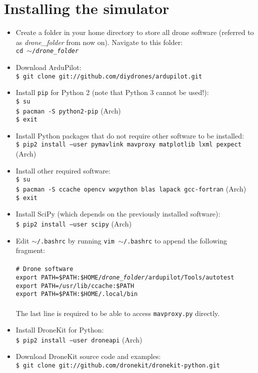 \documentclass{article}
\newcommand{\arch}{{\color{red} (Arch)}}
\begin{document}
\section*{Installing the simulator}
\begin{itemize}
    \item Create a folder in your home directory to store all drone software (referred to
          as \emph{drone\_folder} from now on). Navigate to this folder: \\
          {\tt cd $\sim$/\emph{drone\_folder}}
    \item Download ArduPilot: \\
          {\tt \$ git clone git://github.com/diydrones/ardupilot.git}
    \item Install {\tt pip} for Python 2 (note that Python 3 cannot be used!): \\
          {\tt \$ su} \\
          {\tt \$ pacman -S python2-pip} \arch{} \\
          {\tt \$ exit}
    \item Install Python packages that do not require other software to be installed: \\
          {\tt \$ pip2 install --user pymavlink mavproxy matplotlib lxml pexpect} \arch{}
    \item Install other required software: \\
          {\tt \$ su} \\
          {\tt \$ pacman -S ccache opencv wxpython blas lapack gcc-fortran} \arch{} \\
          {\tt \$ exit}
    \item Install SciPy (which depends on the previously installed software): \\
          {\tt \$ pip2 install --user scipy} \arch{}
    \item Edit {\tt $\sim$/.bashrc} by running {\tt vim $\sim$/.bashrc} to append the following fragment: \\\\
          {\tt \# Drone software} \\
          {\tt export PATH=\$PATH:\$HOME/\emph{drone\_folder}/ardupilot/Tools/autotest} \\
          {\tt export PATH=/usr/lib/ccache:\$PATH} \\
          {\tt export PATH=\$PATH:\$HOME/.local/bin} \\\\
          The last line is required to be able to access {\tt mavproxy.py} directly.
    \item Install DroneKit for Python: \\
          {\tt \$ pip2 install --user droneapi} \arch{}
    \item Download DroneKit source code and examples: \\
          {\tt \$ git clone git://github.com/dronekit/dronekit-python.git}
\end{itemize}
\end{document}
